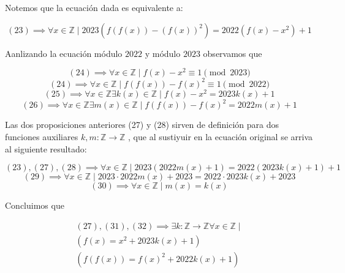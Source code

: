 \documentclass[12pt]{article}
\begin{document}
Notemos que la ecuación dada es equivalente a: 

\begin{equation}
	(23) \implies \forall x \in \mathbb{Z} \mid 2023 (f(f(x)) - (f(x))^2) = 2022 (f(x) - x^2) + 1
\end{equation}

Aanlizando la ecuación módulo $2022$ y módulo $2023$ observamos que 

\begin{equation}
	(24) \implies \forall x \in \mathbb{Z} \mid f(x) - x^2 \equiv 1 \pmod{2023}
\end{equation}
\begin{equation}
	(24) \implies \forall x \in \mathbb{Z} \mid f(f(x)) - f(x)^2 \equiv 1 \pmod{2022}
\end{equation}
\begin{equation}
	(25) \implies \forall x \in \mathbb{Z} \exists k(x) \in \mathbb{Z} \mid f(x) - x^2 = 2023 k(x) + 1
\end{equation}
\begin{equation}
	(26) \implies \forall x \in \mathbb{Z} \exists m(x) \in \mathbb{Z} \mid f(f(x)) - f(x)^2 = 2022 m(x) + 1
\end{equation}

Las dos proposiciones anteriores (27) y (28) sirven de definición para dos funciones auxiliares $k,m : \mathbb{Z} \to \mathbb{Z}$ , que al sustiyuir en la ecuación original se arriva al siguiente resultado:

\begin{equation}
	(23), (27), (28) \implies \forall x \in \mathbb{Z} \mid 2023 (2022 m(x) + 1) = 2022 (2023 k(x) + 1) + 1
\end{equation}
\begin{equation}
	(29) \implies \forall x \in \mathbb{Z} \mid 2023 \cdot 2022 m(x) + 2023 = 2022 \cdot 2023 k(x) + 2023
\end{equation}
\begin{equation}
	(30) \implies \forall x \in \mathbb{Z} \mid m(x) = k(x)
\end{equation}

Concluimos que 

\begin{equation}
\begin{gathered}
	(27), (31), (32) \implies \exists k : \mathbb{Z} \to \mathbb{Z} \forall x \in \mathbb{Z} \mid \\
	(f(x) = x^2 + 2023 k(x) + 1) \\
	(f(f(x)) = f(x)^2 + 2022 k(x) + 1)
\end{gathered}
\end{equation}
\end{document}
